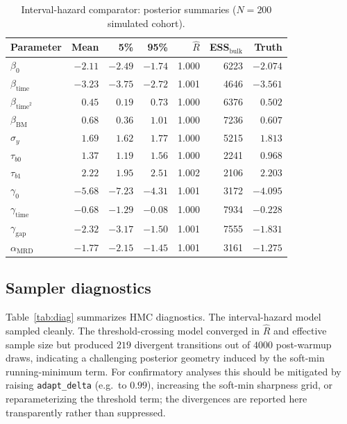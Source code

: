 \documentclass[11pt]{article}
\begin{document}
\begin{table}[H]
\centering
\caption{Interval-hazard comparator: posterior summaries ($N=200$ simulated cohort).}
\label{tab:post-int}
\begin{tabular}{lrrrrrr}
\toprule
Parameter & Mean & 5\% & 95\% & $\widehat R$ & ESS$_{\mathrm{bulk}}$ & Truth\\
\midrule
$\beta_0$              & $-2.11$ & $-2.49$ & $-1.74$ & 1.000 & 6223 & $-2.074$\\
$\beta_{\mathrm{time}}$& $-3.23$ & $-3.75$ & $-2.72$ & 1.001 & 4646 & $-3.561$\\
$\beta_{\mathrm{time}^2}$& $0.45$ & $0.19$ & $0.73$ & 1.000 & 6376 & $0.502$\\
$\beta_{\mathrm{BM}}$  & $0.68$ & $0.36$ & $1.01$ & 1.000 & 7236 & $0.607$\\
$\sigma_y$             & $1.69$ & $1.62$ & $1.77$ & 1.000 & 5215 & $1.813$\\
$\tau_{b0}$            & $1.37$ & $1.19$ & $1.56$ & 1.000 & 2241 & $0.968$\\
$\tau_{b1}$            & $2.22$ & $1.95$ & $2.51$ & 1.002 & 2106 & $2.203$\\
$\gamma_0$             & $-5.68$ & $-7.23$ & $-4.31$ & 1.001 & 3172 & $-4.095$\\
$\gamma_{\mathrm{time}}$& $-0.68$ & $-1.29$ & $-0.08$ & 1.000 & 7934 & $-0.228$\\
$\gamma_{\mathrm{gap}}$& $-2.32$ & $-3.17$ & $-1.50$ & 1.001 & 7555 & $-1.831$\\
$\alpha_{\mathrm{MRD}}$& $-1.77$ & $-2.15$ & $-1.45$ & 1.001 & 3161 & $-1.275$\\
\bottomrule
\end{tabular}
\end{table}

\subsection{Sampler diagnostics}
Table~\ref{tab:diag} summarizes HMC diagnostics. The interval-hazard model
sampled cleanly. The threshold-crossing model converged in $\widehat R$ and
effective sample size but produced $219$ divergent transitions out of $4000$
post-warmup draws, indicating a challenging posterior geometry induced by the
soft-min running-minimum term. For confirmatory analyses this should be
mitigated by raising \texttt{adapt\_delta} (e.g.\ to $0.99$), increasing the
soft-min sharpness grid, or reparameterizing the threshold term; the
divergences are reported here transparently rather than suppressed.
\end{document}
